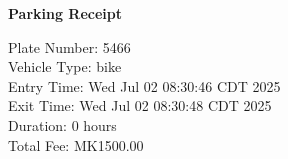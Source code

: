 \documentclass{article}
\begin{document}
\begin{center}
\textbf{Parking Receipt}\\
\end{center}
Plate Number: 5466\\
Vehicle Type: bike\\
Entry Time: Wed Jul 02 08:30:46 CDT 2025\\
Exit Time: Wed Jul 02 08:30:48 CDT 2025\\
Duration: 0 hours\\
Total Fee: MK1500.00\\
\end{document}
